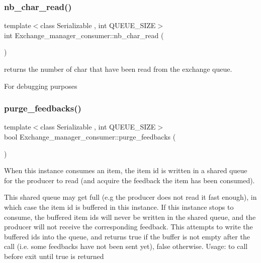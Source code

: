\subsubsection{\texorpdfstring{nb\+\_\+char\+\_\+read()}{nb\_char\_read()}}
{\footnotesize\ttfamily template$<$class Serializable , int Q\+U\+E\+U\+E\+\_\+\+S\+I\+ZE$>$ \\
int Exchange\+\_\+manager\+\_\+consumer\+::nb\+\_\+char\+\_\+read (\begin{DoxyParamCaption}{ }\end{DoxyParamCaption})}



returns the number of char that have been read from the exchange queue. 

For debugging purposes \mbox{\label{classshared__memory_1_1Exchange__manager__consumer_a5e62220c9b50327130cb95683d22b0dc}} 
\subsubsection{\texorpdfstring{purge\+\_\+feedbacks()}{purge\_feedbacks()}}
{\footnotesize\ttfamily template$<$class Serializable , int Q\+U\+E\+U\+E\+\_\+\+S\+I\+ZE$>$ \\
bool Exchange\+\_\+manager\+\_\+consumer\+::purge\+\_\+feedbacks (\begin{DoxyParamCaption}{ }\end{DoxyParamCaption})}



When this instance consumes an item, the item id is written in a shared queue for the producer to read (and acquire the feedback the item has been consumed). 

This shared queue may get full (e.\+g the producer does not read it fast enough), in which case the item id is buffered in this instance. If this instance stops to consume, the buffered item ids will never be written in the shared queue, and the producer will not receive the corresponding feedback. This attempts to write the buffered ids into the queue, and returns true if the buffer is not empty after the call (i.\+e. some feedbacks have not been sent yet), false otherwise. Usage\+: to call before exit until true is returned \mbox{\label{classshared__memory_1_1Exchange__manager__consumer_af1a894d796387d297f848d18d8d55df5}} 
